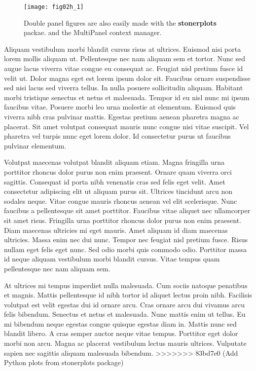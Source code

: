 \begin{figure}
	\centering
	\texttt{[image: fig02h\_1]}
	\caption{Double panel figures are also easily made with the \textbf{stonerplots}\cite{stonerplots} packae.
	and the MultiPanel context manager.}
	\label{fig:fig_label}
\end{figure}



Aliquam vestibulum morbi blandit cursus risus at ultrices. Euismod nisi porta lorem mollis aliquam ut. Pellentesque nec nam aliquam sem et tortor. Nunc sed augue lacus viverra vitae congue eu consequat ac. Feugiat nisl pretium fusce id velit ut. Dolor magna eget est lorem ipsum dolor sit. Faucibus ornare suspendisse sed nisi lacus sed viverra tellus. In nulla posuere sollicitudin aliquam. Habitant morbi tristique senectus et netus et malesuada. Tempor id eu nisl nunc mi ipsum faucibus vitae. Posuere morbi leo urna molestie at elementum. Euismod quis viverra nibh cras pulvinar mattis. Egestas pretium aenean pharetra magna ac placerat. Sit amet volutpat consequat mauris nunc congue nisi vitae suscipit. Vel pharetra vel turpis nunc eget lorem dolor. Id consectetur purus ut faucibus pulvinar elementum.


Volutpat maecenas volutpat blandit aliquam etiam. Magna fringilla urna porttitor rhoncus dolor purus non enim praesent. Ornare quam viverra orci sagittis. Consequat id porta nibh venenatis cras sed felis eget velit. Amet consectetur adipiscing elit ut aliquam purus sit. Ultrices tincidunt arcu non sodales neque. Vitae congue mauris rhoncus aenean vel elit scelerisque. Nunc faucibus a pellentesque sit amet porttitor. Faucibus vitae aliquet nec ullamcorper sit amet risus. Fringilla urna porttitor rhoncus dolor purus non enim praesent. Diam maecenas ultricies mi eget mauris. Amet aliquam id diam maecenas ultricies. Massa enim nec dui nunc. Tempor nec feugiat nisl pretium fusce. Risus nullam eget felis eget nunc. Sed odio morbi quis commodo odio. Porttitor massa id neque aliquam vestibulum morbi blandit cursus. Vitae tempus quam pellentesque nec nam aliquam sem.

At ultrices mi tempus imperdiet nulla malesuada. Cum sociis natoque penatibus et magnis. Mattis pellentesque id nibh tortor id aliquet lectus proin nibh. Facilisis volutpat est velit egestas dui id ornare arcu. Cras ornare arcu dui vivamus arcu felis bibendum. Senectus et netus et malesuada. Nunc mattis enim ut tellus. Eu mi bibendum neque egestas congue quisque egestas diam in. Mattis nunc sed blandit libero. A cras semper auctor neque vitae tempus. Porttitor eget dolor morbi non arcu. Magna ac placerat vestibulum lectus mauris ultrices. Vulputate sapien nec sagittis aliquam malesuada bibendum.
>>>>>>> 83bd7e0 (Add Python plots from stonerplots package)
